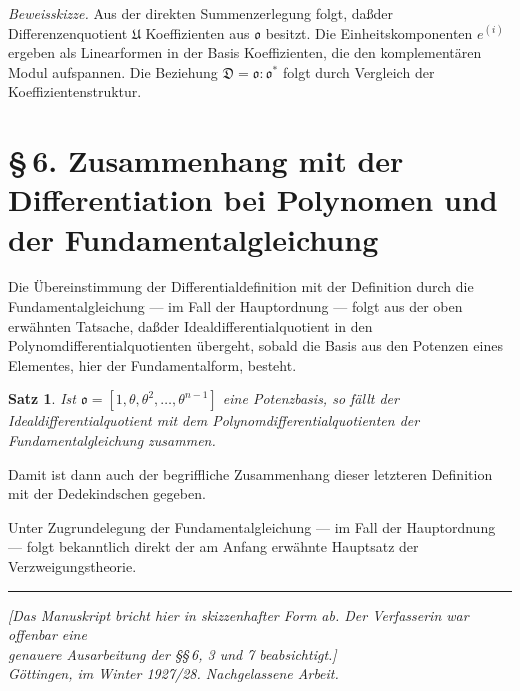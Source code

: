 \documentclass[10pt,a4paper]{article}
\theoremstyle{plain}
\newtheorem{satz}{Satz}[section]
\theoremstyle{definition}
\theoremstyle{remark}
\newcommand{\ido}{\mathfrak{o}}
\newcommand{\idD}{\mathfrak{D}}
\begin{document}
\textit{Beweisskizze.} Aus der direkten Summenzerlegung folgt, da\ss  der Differenzenquotient $\mathfrak{U}$ Koeffizienten aus $\ido$ besitzt. Die Einheitskomponenten $e^{(i)}$ ergeben als Linearformen in der Basis Koeffizienten, die den komplement\"aren Modul aufspannen. Die Beziehung $\idD = \ido : \ido^*$ folgt durch Vergleich der Koeffizientenstruktur.

\newpage
\section*{\S\,6. Zusammenhang mit der Differentiation bei Polynomen und der Fundamentalgleichung}

Die \"Ubereinstimmung der Differentialdefinition mit der Definition durch die Fundamentalgleichung --- im Fall der Hauptordnung --- folgt aus der oben erw\"ahnten Tatsache, da\ss  der Idealdifferentialquotient in den Polynomdifferentialquotienten \"ubergeht, sobald die Basis aus den Potenzen eines Elementes, hier der Fundamentalform, besteht.

\begin{satz}
Ist $\ido = [1, \theta, \theta^2, \ldots, \theta^{n-1}]$ eine Potenzbasis, so f\"allt der Idealdifferentialquotient mit dem Polynomdifferentialquotienten der Fundamentalgleichung zusammen.
\end{satz}

Damit ist dann auch der begriffliche Zusammenhang dieser letzteren Definition mit der Dedekindschen gegeben.

Unter Zugrundelegung der Fundamentalgleichung --- im Fall der Hauptordnung --- folgt bekanntlich direkt der am Anfang erw\"ahnte Hauptsatz der Verzweigungstheorie.

\bigskip
\noindent\rule{\textwidth}{0.4pt}
\begin{center}
\textit{[Das Manuskript bricht hier in skizzenhafter Form ab. Der Verfasserin war offenbar eine}\\
\textit{genauere Ausarbeitung der \S\S\,6, 3 und 7 beabsichtigt.]}\\[0.3em]
\textit{G\"ottingen, im Winter 1927/28. Nachgelassene Arbeit.}
\end{center}

\newpage
\end{document}
